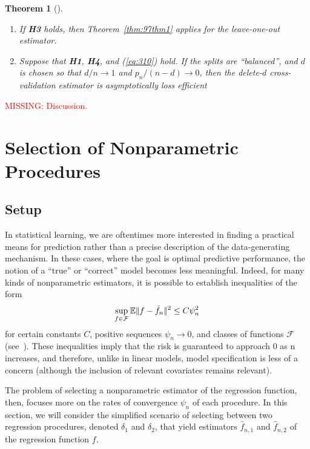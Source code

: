 \documentclass[11pt, letter paper]{article}
\newcommand{\1}{\mathmybb{1}}
\newtheorem{theorem}[proposition]{Theorem}
\newcommand{\0}{\emptyset}
\newcommand{\E}{\mathbb{E}}
\newcommand{\paren}[1]{\left(#1 \right)}
\newcommand{\norm}[1]{|\hspace{-1pt}|#1 |\hspace{-1pt}|}
\newcommand{\normsq}[1]{\norm{#1}^{2}}
\newcommand{\Fcal}{\mathcal{F}}
\begin{document}
\begin{theorem}[\cite{shao_1997}]\label{thm:97thm45}
    \( \)

    \begin{enumerate}
        \item If \textbf{H3} holds, then Theorem~\ref{thm:97thm1} applies for the leave-one-out estimator.
        \item Suppose that \textbf{H1}, \textbf{H4}, and (\ref{eq:310}) hold. If the splits are ``balanced'', and \(d\) is chosen so that \(d/n\to1\) and \(p_n/(n-d) \to 0\), then the delete-\(d\) cross-validation estimator is asymptotically loss efficient 
    \end{enumerate}
\end{theorem}

\textcolor{red}{MISSING: Discussion.}


\section{Selection of Nonparametric Procedures}

\subsection{Setup}

In statistical learning, we are oftentimes more interested in finding a practical means for prediction rather than a precise description of the data-generating mechanism. In these cases, where the goal is optimal predictive performance, the notion of a ``true'' or ``correct'' model becomes less meaningful. Indeed, for many kinds of nonparametric estimators, it is possible to establish inequalities of the form
\[\sup_{f\in\Fcal}\E{\normsq{f - \hat{f}_{n}}} \leq C\psi_{n}^{2}\]
for certain constants \(C\), positive sequences \(\psi_{n}\to 0\), and classes of functions \(\Fcal\) (see~\cite{tsybakov_introduction_2009}). These inequalities imply that the risk is guaranteed to approach 0 as n increases, and therefore, unlike in linear models, model specification is less of a concern (although the inclusion of relevant covariates remains relevant). 

The problem of selecting a nonparametric estimator of the regression function, then, focuses more on the rates of convergence \(\psi_{n}\) of each procedure. In this section, we will consider the simplified scenario of selecting between 
two regression procedures, denoted \(\delta_{1}\) and \(\delta_{2}\), that yield estimators \(\hat{f}_{n, 1}\) and \(\hat{f}_{n, 2}\) of the regression function \(f\).
\end{document}
